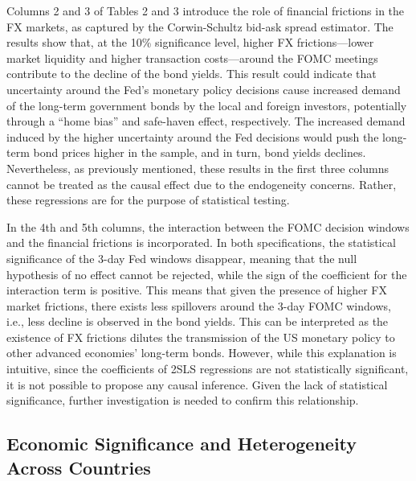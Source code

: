 Columns 2 and 3 of Tables 2 and 3 introduce the role of financial frictions in the FX markets, as captured by the Corwin-Schultz bid-ask spread estimator. The results show that, at the 10\% significance level, higher FX frictions---lower market liquidity and higher transaction costs---around the FOMC meetings contribute to the decline of the bond yields. This result could indicate that uncertainty around the Fed's monetary policy decisions cause increased demand of the long-term government bonds by the local and foreign investors, potentially through a ``home bias'' and safe-haven effect, respectively. The increased demand induced by the higher uncertainty around the Fed decisions would push the long-term bond prices higher in the sample, and in turn, bond yields declines. Nevertheless, as previously mentioned, these results in the first three columns cannot be treated as the causal effect due to the endogeneity concerns. Rather, these regressions are for the purpose of statistical testing.



In the 4th and 5th columns, the interaction between the FOMC decision windows and the financial frictions is incorporated. In both specifications, the statistical significance of the 3-day Fed windows disappear, meaning that the null hypothesis of no effect cannot be rejected, while the sign of the coefficient for the interaction term is positive. This means that given the presence of higher FX market frictions, there exists less spillovers around the 3-day FOMC windows, i.e., less decline is observed in the bond yields. This can be interpreted as the existence of FX frictions dilutes the transmission of the US monetary policy to other advanced economies' long-term bonds. However, while this explanation is intuitive, since the coefficients of 2SLS regressions are not statistically significant, it is not possible to propose any causal inference. Given the lack of statistical significance, further investigation is needed to confirm this relationship.

\subsection{Economic Significance and Heterogeneity Across Countries}

